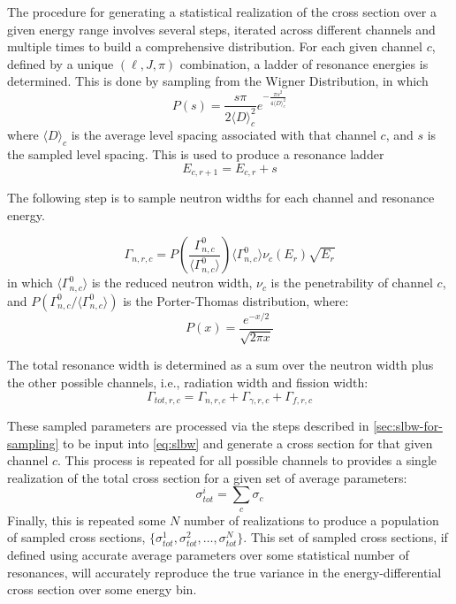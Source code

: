 The procedure for generating a statistical realization of the cross section over a given energy range involves several steps, iterated across different channels and multiple times to build a comprehensive distribution. For each given channel $c$, defined by a unique $(\ell, J, \pi)$ combination, a ladder of resonance energies is determined. This is done by sampling from the Wigner Distribution, in which
\begin{equation}
    P(s) = \frac{s\pi}{2 \langle D \rangle_c^2} e^{-\frac{\pi s^2}{4 \langle D \rangle_c^2}}
\end{equation}
where $\langle D \rangle_c$ is the average level spacing associated with that channel $c$, and $s$ is the sampled level spacing. This is used to produce a resonance ladder
\begin{equation}
    E_{c,r+1} = E_{c,r} + s
\end{equation}

The following step is to sample neutron widths for each channel and resonance energy.

\begin{equation}
    \Gamma_{n,r,c} = P\left( \frac{\Gamma_{n,c}^0}{\langle \Gamma_{n,c}^0  \rangle}\right)\langle \Gamma_{n,c}^0  \rangle \nu_c(E_r) \sqrt{E_r}
\end{equation}
in which $\langle \Gamma_{n,c}^0  \rangle$ is the reduced neutron width, $\nu_c$ is the penetrability of channel $c$, and $P\left( \Gamma_{n,c}^0 / \langle \Gamma_{n,c}^0  \rangle \right)$ is the Porter-Thomas distribution, where:
\begin{equation}
    P(x) = \frac{e^{-x/2}}{\sqrt{2\pi x}}
\end{equation}

The total resonance width is determined as a sum over the neutron width plus the other possible channels, i.e., radiation width and fission width:
\begin{equation}
    \Gamma_{tot,r,c} = \Gamma_{n,r,c} + \Gamma_{\gamma,r,c} + \Gamma_{f,r,c}
\end{equation}

These sampled parameters are processed via the steps described in \autoref{sec:slbw-for-sampling} to be input into \autoref{eq:slbw} and generate a cross section for that given channel $c$. This process is repeated for all possible channels to provides a single realization of the total cross section for a given set of average parameters:
\begin{equation}
    \sigma_{tot}^i = \sum_c \sigma_c
\end{equation}
Finally, this is repeated some $N$ number of realizations to produce a population of sampled cross sections, $\{ \sigma_{tot}^1, \sigma_{tot}^2, \ldots, \sigma_{tot}^{N} \}$. This set of sampled cross sections, if defined using accurate average parameters over some statistical number of resonances, will accurately reproduce the true variance in the energy-differential cross section over some energy bin.


